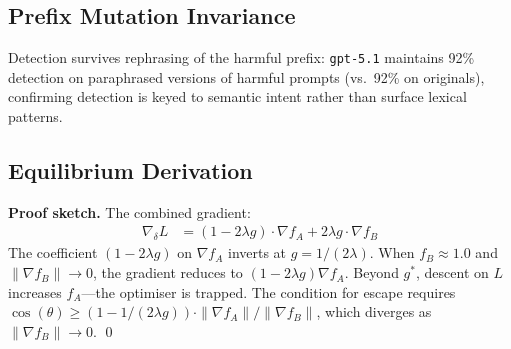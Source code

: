 \documentclass{article}
\begin{document}
\subsection{Prefix Mutation Invariance}

Detection survives rephrasing of the harmful prefix: \texttt{gpt-5.1} maintains 92\% detection on paraphrased versions of harmful prompts (vs.\ 92\% on originals), confirming detection is keyed to semantic intent rather than surface lexical patterns.

\subsection{Equilibrium Derivation}
\label{app:derivation}

\noindent{}\medskip

\noindent\textbf{Proof sketch.} The combined gradient:
\begin{align}
\nabla_\delta L &= (1 - 2\lambda g) \cdot \nabla f_A + 2\lambda g \cdot \nabla f_B
\end{align}
The coefficient $(1 - 2\lambda g)$ on $\nabla f_A$ inverts at $g = 1/(2\lambda)$. When $f_B \approx 1.0$ and $\|\nabla f_B\| \to 0$, the gradient reduces to $(1 - 2\lambda g)\nabla f_A$. Beyond $g^*$, descent on $L$ increases $f_A$---the optimiser is trapped. The condition for escape requires $\cos(\theta) \geq (1 - 1/(2\lambda g)) \cdot \|\nabla f_A\|/\|\nabla f_B\|$, which diverges as $\|\nabla f_B\| \to 0$. \qed
\end{document}
